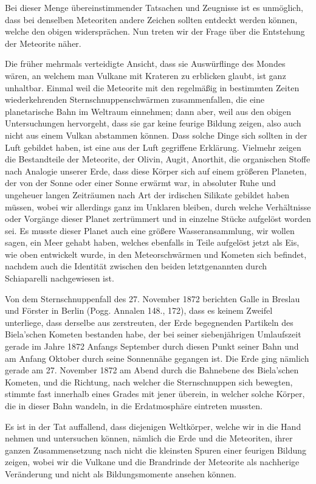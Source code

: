 \documentclass[a4paper, 11pt, oneside, german]{article}
\begin{document}
Bei dieser Menge übereinstimmender Tatsachen und Zeugnisse ist es unmöglich, dass bei denselben Meteoriten andere Zeichen sollten entdeckt werden können, welche den obigen widersprächen. Nun treten wir der Frage über die Entstehung der Meteorite näher.

Die früher mehrmals verteidigte Ansicht, dass sie Auswürflinge des Mondes wären, an welchem man Vulkane mit Krateren zu erblicken glaubt, ist ganz unhaltbar. Einmal weil die Meteorite mit den regelmäßig in bestimmten Zeiten wiederkehrenden Sternschnuppenschwärmen zusammenfallen, die eine planetarische Bahn im Weltraum einnehmen; dann aber, weil aus den obigen Untersuchungen hervorgeht, dass sie gar keine feurige Bildung zeigen, also auch nicht aus einem Vulkan abstammen können. Dass solche Dinge sich sollten in der Luft gebildet haben, ist eine aus der Luft gegriffene Erklärung. Vielmehr zeigen die Bestandteile der Meteorite, der Olivin, Augit, Anorthit, die organischen Stoffe nach Analogie unserer Erde, dass diese Körper sich auf einem größeren Planeten, der von der Sonne oder einer Sonne erwärmt war, in absoluter Ruhe und ungeheuer langen Zeiträumen nach Art der irdischen Silikate gebildet haben müssen, wobei wir allerdings ganz im Unklaren bleiben, durch welche Verhältnisse oder Vorgänge dieser Planet zertrümmert und in einzelne Stücke aufgelöst worden sei. Es musste dieser Planet auch eine größere Wasseransammlung, wir wollen sagen, ein Meer gehabt haben, welches ebenfalls in Teile aufgelöst jetzt als Eis, wie oben entwickelt wurde, in den Meteorschwärmen und Kometen sich befindet, nachdem auch die Identität zwischen den beiden letztgenannten durch Schiaparelli nachgewiesen ist.

Von dem Sternschnuppenfall des 27. November 1872 berichten Galle in Breslau und Förster in Berlin (Pogg. Annalen 148., 172), dass es keinem Zweifel unterliege, dass derselbe aus zerstreuten, der Erde begegnenden Partikeln des Biela'schen Kometen bestanden habe, der bei seiner siebenjährigen Umlaufszeit gerade im Jahre 1872 Anfangs September durch diesen Punkt seiner Bahn und am Anfang Oktober durch seine Sonnennähe gegangen ist. Die Erde ging nämlich gerade am 27. November 1872 am Abend durch die Bahnebene des Biela'schen Kometen, und die Richtung, nach welcher die Sternschnuppen sich bewegten, stimmte fast innerhalb eines Grades mit jener überein, in welcher solche Körper, die in dieser Bahn wandeln, in die Erdatmosphäre eintreten mussten.

Es ist in der Tat auffallend, dass diejenigen Weltkörper, welche wir in die Hand nehmen und untersuchen können, nämlich die Erde und die Meteoriten, ihrer ganzen Zusammensetzung nach nicht die kleinsten Spuren einer feurigen Bildung zeigen, wobei wir die Vulkane und die Brandrinde der Meteorite als nachherige Veränderung und nicht als Bildungsmomente ansehen können.
\end{document}
